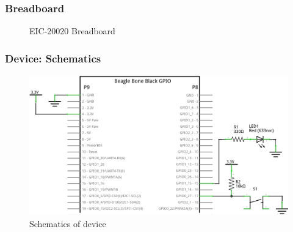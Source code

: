 \begin{frame}
  \frametitle{Breadboard}
    \begin{figure}
      \centering
      \begin{overlayarea}{\textwidth}{0.8\textheight}
        \caption{EIC-20020 Breadboard}
      \end{overlayarea}
  \end{figure}
\end{frame}

\begin{frame}
  \frametitle{Device: Schematics}
    \begin{figure}
      \centering
      \includegraphics[scale=1]{images/lab1_schem.png}
      \caption{Schematics of device}
  \end{figure}
  \vspace*{-5mm}
\end{frame}

